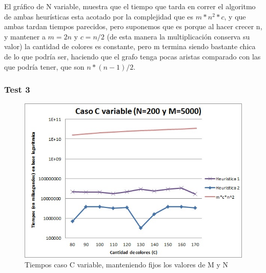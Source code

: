 El gráfico de N variable, muestra que el tiempo que tarda en correr el algoritmo de ambas heurísticas esta acotado por la complejidad que es $m*n^2*c$, y que ambas tardan tiempos parecidos, pero suponemos que es porque al hacer crecer n, y mantener a $m = 2n$ y $c=n/2$ (de esta manera la multiplicación conserva su valor) la cantidad de colores es constante, pero m termina siendo bastante chica de lo que podría ser, haciendo que el grafo tenga pocas aristas comparado con las que podría tener, que son $n*(n-1)/2$.

\subsubsection{Test 3}

\vspace*{0.3cm}

\begin{figure}[H]
  \begin{center}
      \includegraphics[scale=0.75]{../Ejercicio4CVariable.jpg}
  \end{center}
  \caption{Tiempos caso C variable, manteniendo fijos los valores de M y N}
\end{figure}
  
